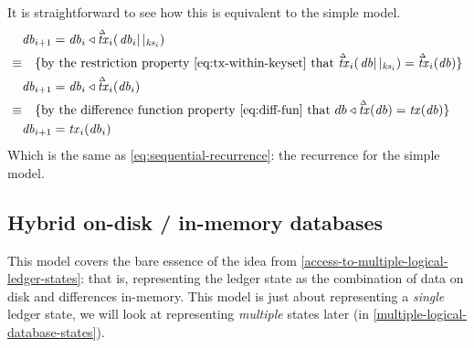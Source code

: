 \documentclass[11pt,a4paper]{article}
\newcommand\restrict[2]{\left.#1\right||_{#2}}
\newcommand\deltavar[1]{\accentset{\Delta}{#1}}
\begin{document}
It is straightforward to see how this is equivalent to the simple model.
\begin{align*}
       & \mathit{db}_{i+1} = \mathit{db}_i \triangleleft \deltavar{\mathit{tx}}_i(\restrict{\mathit{db}_i}{\mathit{ks}_i}) \\
\equiv & \quad \text{\{by the restriction property \cref{eq:tx-within-keyset} that
                     $\deltavar{\mathit{tx}}_i(\restrict{\mathit{db}}{\mathit{ks}_i}) = \deltavar{\mathit{tx}}_i(\mathit{db})$\}} \\
       & \mathit{db}_{i+1} = \mathit{db}_i \triangleleft \deltavar{\mathit{tx}}_i(\mathit{db}_i) \\
\equiv & \quad \text{\{by the difference function property \cref{eq:diff-fun} that
                     $db \triangleleft \deltavar{\mathit{tx}}(\mathit{db}) = \mathit{tx}(\mathit{db})$\}} \\
       & \mathit{db}_{i+1} = \mathit{tx}_i(\mathit{db}_i)
\end{align*}
Which is the same as \cref{eq:sequential-recurrence}: the recurrence for the simple model.

\subsection{Hybrid on-disk / in-memory databases}
\label{sec:hybrid-on-disk-in-memory-db}

This model covers the bare essence of the idea from
\cref{access-to-multiple-logical-ledger-states}: that is, representing the
ledger state as the combination of data on disk and differences in-memory. This
model is just about representing a \emph{single} ledger state, we will look at
representing \emph{multiple} states later (in \cref{multiple-logical-database-states}).
\end{document}
